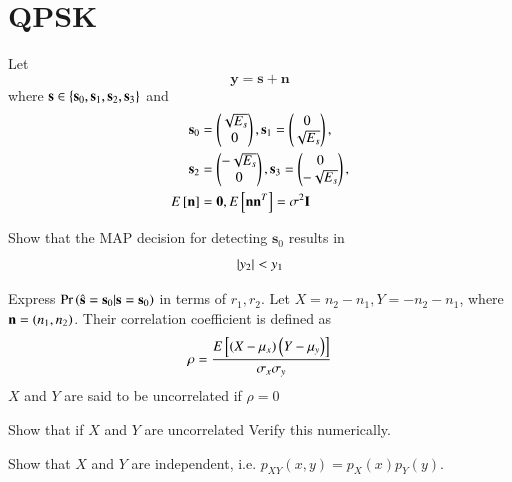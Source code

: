 \documentclass[journal,12pt,twocolumn]{IEEEtran}
\begin{document}
\section{QPSK}
Let
\begin{equation}
\mathbf{y} = \mathbf{s}+ \mathbf{n}
\end{equation}
where $\mathbf{s} \in \left\{\mathbf{s}_0,\mathbf{s}_1,\mathbf{s}_2, \mathbf{s}_3\right\}$ and
\begin{align}
\mathbf{s}_0 &= 
\begin{pmatrix*}
\sqrt{E_s}\\
0
\end{pmatrix*},
\mathbf{s}_1 = 
\begin{pmatrix*}
0\\
\sqrt{E_s}
\end{pmatrix*},
\\
\mathbf{s}_2 &= 
\begin{pmatrix*}
-\sqrt{E_s}\\
0
\end{pmatrix*},
\mathbf{s}_3 = 
\begin{pmatrix*}
0\\
-\sqrt{E_s}
\end{pmatrix*},
\\
E\sbrak{\mathbf{n}} &= \mathbf{0}, E\sbrak{\mathbf{n}\mathbf{n}^T} = \sigma^2 \mathbf{I}
\end{align}
%
\begin{problem}
Show that the MAP decision for detecting $\mathbf{s}_0$ results in
\begin{equation}
\left\vert y_2\right\vert < y_1
\end{equation}
\end{problem}
\begin{problem}
Express $\Pr\left(\hat{\mathbf{s}} = \mathbf{s}_0|\mathbf{s} = \mathbf{s}_0\right)$ in terms of $r_1, r_2$.
Let $X=n_2-n_1, Y = -n_2-n_1$, where $\mathbf{n}=\left(n_1,n_2\right)$.
Their correlation coefficient is defined as
%
\begin{align}
\rho = \frac{E{}\left[\left(X-\mu_x\right)\left(Y-\mu_y\right)\right]}{\sigma_x\sigma_y}
\end{align}
%
$X$ and $Y$ are said to be uncorrelated if $\rho = 0$
\end{problem}
\begin{problem}
Show that if $X$ and $Y$ are uncorrelated 
Verify this numerically.
\end{problem}
\begin{problem}
Show that $X$ and $Y$ are independent, i.e. $p_{XY}(x,y) = p_{X}(x)p_{Y}(y)$.
\end{problem}
\end{document}
